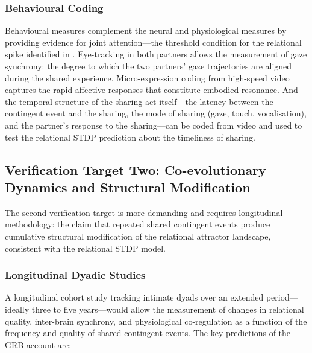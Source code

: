 \subsubsection{Behavioural Coding}
\label{p14:subsubsec:behav}

\noindent
Behavioural measures complement the neural and physiological measures by providing evidence for joint attention---the threshold condition for the relational spike identified in . Eye-tracking in both partners allows the measurement of gaze synchrony: the degree to which the two partners' gaze trajectories are aligned during the shared experience. Micro-expression coding from high-speed video captures the rapid affective responses that constitute embodied resonance. And the temporal structure of the sharing act itself---the latency between the contingent event and the sharing, the mode of sharing (gaze, touch, vocalisation), and the partner's response to the sharing---can be coded from video and used to test the relational STDP prediction about the timeliness of sharing.

\subsection{Verification Target Two: Co-evolutionary Dynamics and Structural Modification}
\label{p14:subsec:vt2}

\noindent
The second verification target is more demanding and requires longitudinal methodology: the claim that repeated shared contingent events produce cumulative structural modification of the relational attractor landscape, consistent with the relational STDP model.

\subsubsection{Longitudinal Dyadic Studies}
\label{p14:subsubsec:longitudinal}

\noindent
A longitudinal cohort study tracking intimate dyads over an extended period---ideally three to five years---would allow the measurement of changes in relational quality, inter-brain synchrony, and physiological co-regulation as a function of the frequency and quality of shared contingent events. The key predictions of the GRB account are:

